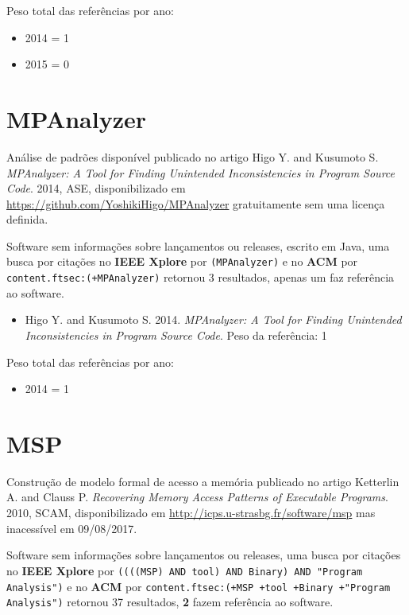 Peso total das referências por ano:

\begin{itemize}
\item 2014 = 1
\item 2015 = 0
\end{itemize}


\section{MPAnalyzer}

Análise de padrões disponível
publicado no artigo
Higo Y. and Kusumoto S.
{\it MPAnalyzer: A Tool for Finding Unintended Inconsistencies in Program Source Code}.
2014,
ASE,
disponibilizado em \url{https://github.com/YoshikiHigo/MPAnalyzer}
gratuitamente
sem uma licença definida.

Software sem informações sobre lançamentos ou releases,
escrito em Java,
uma busca por citações no {\bf IEEE Xplore} por
\texttt{(MPAnalyzer)}
e no {\bf ACM} por
\texttt{content.ftsec:(+MPAnalyzer)}
retornou
3 resultados,
apenas um faz referência ao software.

\begin{itemize}
\item Higo Y. and Kusumoto S.
      2014.
      {\it MPAnalyzer: A Tool for Finding Unintended Inconsistencies in Program Source Code}.
      Peso da referência: 1
\end{itemize}

Peso total das referências por ano:

\begin{itemize}
\item 2014 = 1
\end{itemize}


\section{MSP}

Construção de modelo formal de acesso a memória
publicado no artigo
Ketterlin A. and Clauss P.
{\it Recovering Memory Access Patterns of Executable Programs}.
2010,
SCAM,
disponibilizado em \url{http://icps.u-strasbg.fr/software/msp}
mas inacessível em 09/08/2017.

Software sem informações sobre lançamentos ou releases,
uma busca por citações no {\bf IEEE Xplore} por
\texttt{((((MSP) AND tool) AND Binary) AND "Program Analysis")}
e no {\bf ACM} por
\texttt{content.ftsec:(+MSP +tool +Binary +"Program Analysis")}
retornou
37 resultados,
{\bf 2} fazem referência ao software.


